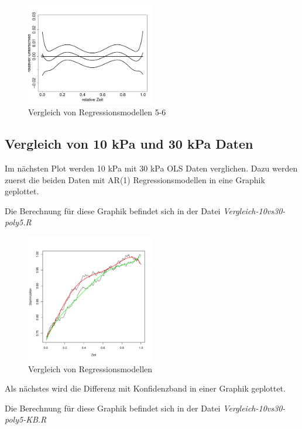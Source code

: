 \documentclass[12pt,a4paper]{article}
\theoremstyle{definition}
\theoremstyle{definition}
\theoremstyle{definition}
\theoremstyle{definition}
\begin{document}
\begin{figure}[H] 
  \centering
     \includegraphics[width=0.5\textwidth]{10kPa-poly-KB-5-6.pdf}
  \caption{Vergleich von Regressionsmodellen 5-6}
  \label{fig:14.2}
\end{figure}


\subsection{Vergleich von 10 kPa und 30 kPa Daten}
Im nächsten Plot werden 10 kPa mit 30 kPa OLS Daten verglichen. Dazu werden zuerst die beiden Daten mit AR(1) Regressionsmodellen in eine Graphik geplottet.

Die Berechnung für diese Graphik befindet sich in der Datei \textit{Vergleich-10vs30-poly5.R}

\begin{figure}[H] 
  \centering
     \includegraphics[width=0.5\textwidth]{Vergleich-10vs30-poly5}
  \caption{Vergleich von Regressionsmodellen}
  \label{fig:9}
\end{figure}


Als nächstes wird die Differenz mit Konfidenzband in einer Graphik geplottet.

Die Berechnung für diese Graphik befindet sich in der Datei \textit{Vergleich-10vs30-poly5-KB.R}
\end{document}
